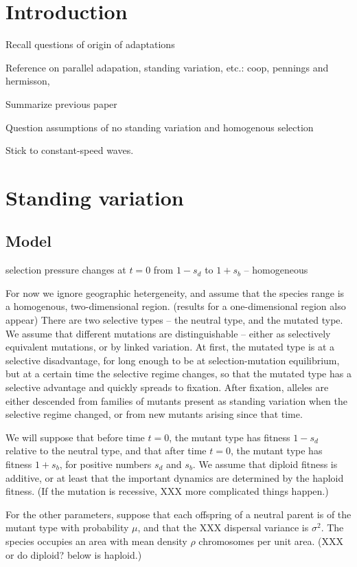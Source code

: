 \documentclass{article}
\begin{document}
\section{Introduction}

Recall questions of origin of adaptations

Reference on parallel adapation, standing variation, etc.:
 coop,
 pennings and hermisson,

Summarize previous paper

Question assumptions of no standing variation and homogenous selection

Stick to constant-speed waves.

\section{Standing variation}

\subsection{Model}

selection pressure changes at $t=0$ from $1-s_d$ to $1+s_b$ -- homogeneous

For now we ignore geographic hetergeneity, and assume that the species range
is a homogenous, two-dimensional region.  (results for a one-dimensional region also appear)
There are two selective types -- the neutral type, and the mutated type.
We assume that different mutations are distinguishable --
either as selectively equivalent mutations, or by linked variation.
At first, the mutated type is at a selective disadvantage, for long enough to be at selection-mutation equilibrium,
but at a certain time the selective regime changes, so that the mutated type has a selective advantage and quickly spreads to fixation.
After fixation, alleles are either descended
from families of mutants present as standing variation when the selective regime changed,
or from new mutants arising since that time.

We will suppose that before time $t=0$,
the mutant type has fitness $1-s_d$ relative to the neutral type,
and that after time $t=0$,
the mutant type has fitness $1+s_b$,
for positive numbers $s_d$ and $s_b$.
We assume that diploid fitness is additive, or at least that the important dynamics are determined by the haploid fitness.
(If the mutation is recessive, XXX more complicated things happen.)

For the other parameters,
suppose that each offspring of a neutral parent is of the mutant type with probability $\mu$,
and that the XXX dispersal variance is $\sigma^2$.
The species occupies an area with mean density
$\rho$ chromosomes per unit area.
(XXX or do diploid? below is haploid.)
\end{document}
